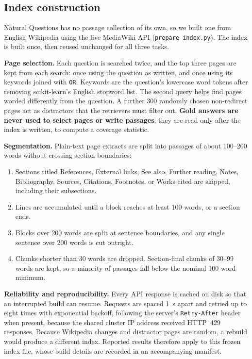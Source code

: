 \documentclass[11pt,a4paper]{article}
\begin{document}
\subsection{Index construction}
Natural Questions has no passage collection of its own, so we built one from English Wikipedia using the live MediaWiki API (\texttt{prepare\_index.py}). The index is built once, then reused unchanged for all three tasks.

\textbf{Page selection.} Each question is searched twice, and the top three pages are kept from each search: once using the question as written, and once using its keywords joined with \texttt{OR}. Keywords are the question's lowercase word tokens after removing scikit-learn's English stopword list. The second query helps find pages worded differently from the question. A further 300 randomly chosen non-redirect pages act as distractors that the retrievers must filter out. \textbf{Gold answers are never used to select pages or write passages}; they are read only after the index is written, to compute a coverage statistic.

\textbf{Segmentation.} Plain-text page extracts are split into passages of about 100--200 words without crossing section boundaries:
\begin{enumerate}
    \item Sections titled References, External links, See also, Further reading, Notes, Bibliography, Sources, Citations, Footnotes, or Works cited are skipped, including their subsections.
    \item Lines are accumulated until a block reaches at least 100 words, or a section ends.
    \item Blocks over 200 words are split at sentence boundaries, and any single sentence over 200 words is cut outright.
    \item Chunks shorter than 30 words are dropped. Section-final chunks of 30--99 words are kept, so a minority of passages fall below the nominal 100-word minimum.
\end{enumerate}

\textbf{Reliability and reproducibility.} Every API response is cached on disk so that an interrupted build can resume. Requests are spaced 1~s apart and retried up to eight times with exponential backoff, following the server's \texttt{Retry-After} header when present, because the shared cluster IP address received HTTP~429 responses. Because Wikipedia changes and distractor pages are random, a rebuild would produce a different index. Reported results therefore apply to this frozen index file, whose build details are recorded in an accompanying manifest.
\end{document}
